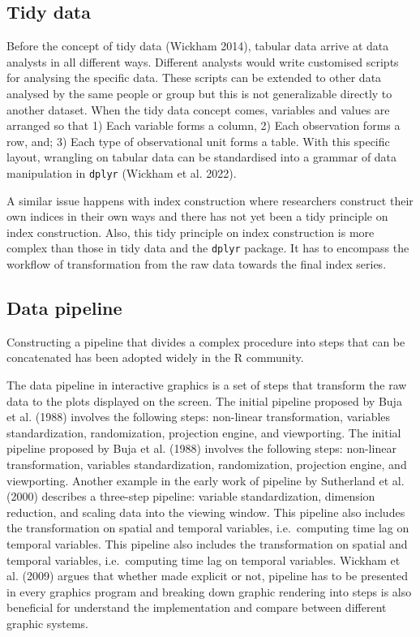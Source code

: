 \documentclass[
]{article}
\begin{document}
\hypertarget{tidy-data}{%
\subsection{Tidy data}\label{tidy-data}}

Before the concept of tidy data (Wickham 2014), tabular data arrive at
data analysts in all different ways. Different analysts would write
customised scripts for analysing the specific data. These scripts can be
extended to other data analysed by the same people or group but this is
not generalizable directly to another dataset. When the tidy data
concept comes, variables and values are arranged so that 1) Each
variable forms a column, 2) Each observation forms a row, and; 3) Each
type of observational unit forms a table. With this specific layout,
wrangling on tabular data can be standardised into a grammar of data
manipulation in \texttt{dplyr} (Wickham et al. 2022).

A similar issue happens with index construction where researchers
construct their own indices in their own ways and there has not yet been
a tidy principle on index construction. Also, this tidy principle on
index construction is more complex than those in tidy data and the
\texttt{dplyr} package. It has to encompass the workflow of
transformation from the raw data towards the final index series.

\hypertarget{data-pipeline}{%
\subsection{Data pipeline}\label{data-pipeline}}

Constructing a pipeline that divides a complex procedure into steps that
can be concatenated has been adopted widely in the R community.

The data pipeline in interactive graphics is a set of steps that
transform the raw data to the plots displayed on the screen. The initial
pipeline proposed by Buja et al. (1988) involves the following steps:
non-linear transformation, variables standardization, randomization,
projection engine, and viewporting. The initial pipeline proposed by
Buja et al. (1988) involves the following steps: non-linear
transformation, variables standardization, randomization, projection
engine, and viewporting. Another example in the early work of pipeline
by Sutherland et al. (2000) describes a three-step pipeline: variable
standardization, dimension reduction, and scaling data into the viewing
window. This pipeline also includes the transformation on spatial and
temporal variables, i.e.~computing time lag on temporal variables. This
pipeline also includes the transformation on spatial and temporal
variables, i.e.~computing time lag on temporal variables. Wickham et al.
(2009) argues that whether made explicit or not, pipeline has to be
presented in every graphics program and breaking down graphic rendering
into steps is also beneficial for understand the implementation and
compare between different graphic systems.
\end{document}
